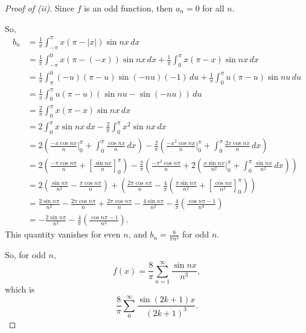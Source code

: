 \documentclass[../hw5]{subfiles}
\begin{document}
\begin{proof}[Proof of (ii)]
	Since $f$ is an odd function,  then $a_n=0$ for all  $n$.

	So,
	\begin{align*}
		b_n & = \frac{1}{\pi}\int_{-\pi }^{\pi } x(\pi- |x| )\sin{nx}  \,dx                                                                                                    \\
		    & = \frac{1}{\pi }\int_{-\pi }^{0 } x(\pi-(-x) )\sin{nx}  \,dx
		+ \frac{1}{\pi }\int_{0}^{\pi } x(\pi-x )\sin{nx}  \,dx                                                                                                                \\
		    & = \frac{1}{\pi }\int_{\pi }^{0} (-u)(\pi-u )\sin{(-nu)}(-1)  \,du
		+\frac{1}{\pi } \int_{0}^{\pi } u(\pi-u )\sin{nu}  \,du                                                                                                                \\
		    & = \frac{1}{\pi }\int_{0}^{\pi } u(\pi-u )(\sin{nu}-\sin{(-nu)}  ) \,du                                                                                           \\
		    & = \frac{2}{\pi }\int_{0}^{\pi } x(\pi-x )\sin{nx}  \,dx                                                                                                          \\
		    & = 2 \int_{0}^{\pi } x\sin{nx} \,dx - \frac{2}{\pi }\int_{0}^{\pi } x^2\sin{nx}  \,dx                                                                             \\
		    & = 2\left( {\frac{-x\cos{nx} }{n}}\bigg\vert_0^{\pi }+\int_{0}^{\pi } \frac{\cos{nx} }{n } \,dx \right)
		- \frac{2}{\pi }\left( {\frac{-x^2\cos{nx} }{n}}\bigg\vert_0^{\pi }+\int_{0}^{\pi } \frac{2x \cos{nx} }{n} \,dx \right)                                                \\
		    & = 2\left( \frac{-\pi\cos{n\pi}}{n}+ {\left[ \frac{\sin{nx}}{n} \right]}_0^{\pi }   \right)
		-\frac{2}{\pi }\left( \frac{-\pi^2 \cos{n\pi } }{n} + 2\left( \frac{x\sin{nx} }{n^2}\bigg\vert_0^{\pi } + \int_{0 }^{\pi } \frac{\sin{nx} }{n^2} \,dx \right)  \right) \\
		    & = 2\left( \frac{\sin{n\pi } }{n^2} - \frac{\pi \cos{n\pi }  }{n}\right)
		+ \left( \frac{2\pi\cos{n\pi }}{n} - \frac{4}{\pi }\left( \frac{\pi\sin{n\pi }  }{n^2} + {\left[ \frac{\cos{nx} }{n^3} \right] }_0^{\pi } \right)  \right)             \\
		    & =  \frac{2\sin{n\pi } }{n^2} - \frac{2\pi \cos{n\pi }  }{n}
		+ \frac{2\pi\cos{n\pi}}{n}-\frac{4\sin{n\pi}}{n^2}-\frac{4}{\pi}\left( \frac{\cos{n\pi }-1 }{n^3} \right)                                                              \\
		    & = -\frac{2\sin{n\pi}}{n^2}  -\frac{4}{\pi} \left( \frac{\cos{n\pi}-1 }{n^3}\right)
		.\end{align*}
	This quantity vanishes for even $n$, and $b_n = \frac{8}{\pi n^3}$ for odd $n$.

	So, for odd $n$, \[
		f(x)=\frac{8}{\pi}\sum_{n=1}^{\infty} \frac{\sin{nx} }{n^3}
		,\] which is \[
		\frac{8}{\pi}\sum_{0}^{\infty} \frac{\sin{(2k+1)x}}{{(2k+1)}^3}
		.\]
\end{proof}
\end{document}
